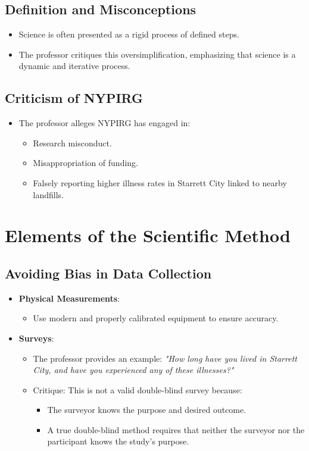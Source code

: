 \documentclass[12pt]{article}
\begin{document}
\subsection*{Definition and Misconceptions}
\begin{itemize}
    \item Science is often presented as a rigid process of defined steps.
    \item The professor critiques this oversimplification, emphasizing that science is a dynamic and iterative process.
\end{itemize}

\subsection*{Criticism of NYPIRG}
\begin{itemize}
    \item The professor alleges NYPIRG has engaged in:
    \begin{itemize}
        \item Research misconduct.
        \item Misappropriation of funding.
        \item Falsely reporting higher illness rates in Starrett City linked to nearby landfills.
    \end{itemize}
\end{itemize}

\section*{Elements of the Scientific Method}
\subsection*{Avoiding Bias in Data Collection}
\begin{itemize}
    \item \textbf{Physical Measurements}:
    \begin{itemize}
        \item Use modern and properly calibrated equipment to ensure accuracy.
    \end{itemize}
    \item \textbf{Surveys}:
    \begin{itemize}
        \item The professor provides an example: \textit{"How long have you lived in Starrett City, and have you experienced any of these illnesses?"}
        \item Critique: This is not a valid double-blind survey because:
        \begin{itemize}
            \item The surveyor knows the purpose and desired outcome.
            \item A true double-blind method requires that neither the surveyor nor the participant knows the study's purpose.
        \end{itemize}
    \end{itemize}
\end{itemize}
\end{document}
